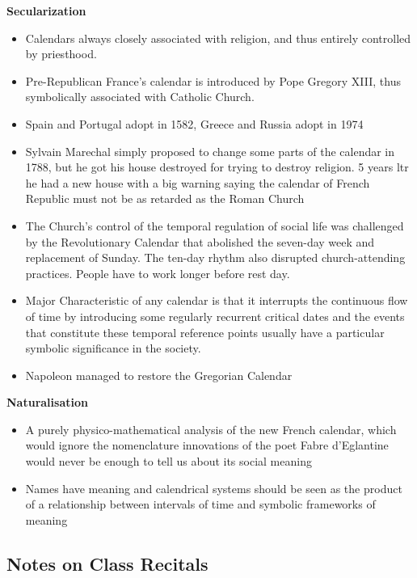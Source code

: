 \documentclass[a4paper]{article}
\begin{document}
\noindent\textbf{Secularization}
\begin{itemize}
	\item Calendars always closely associated with religion, and thus entirely controlled by priesthood.
	\item Pre-Republican France's calendar is introduced by Pope Gregory XIII, thus symbolically associated with Catholic Church.
	\item Spain and Portugal adopt in 1582, Greece and Russia adopt in 1974
	\item Sylvain Marechal simply proposed to change some parts of the calendar in 1788, but he got his house destroyed for trying to destroy religion. 5 years ltr he had a new house with a big warning saying the calendar of French Republic must not be as retarded as the Roman Church
	\item The Church's control of the temporal regulation of social life was challenged by the Revolutionary Calendar that abolished the seven-day week and replacement of Sunday. The ten-day rhythm also disrupted church-attending practices. People have to work longer before rest day.
	\item Major Characteristic of any calendar is that it interrupts the continuous flow of time by introducing some regularly recurrent critical dates and the events that constitute these temporal reference points usually have a particular symbolic significance in the society.
	\item Napoleon managed to restore the Gregorian Calendar 
\end{itemize}

\medskip

\noindent\textbf{Naturalisation}
\begin{itemize}
	\item A purely physico-mathematical analysis of the new French calendar, which would ignore the nomenclature innovations of the poet Fabre d'Eglantine would never be enough to tell us about its social meaning
	\item Names have meaning and calendrical systems should be seen as the product of a relationship between intervals of time and symbolic frameworks of meaning
\end{itemize}

\subsection{Notes on Class Recitals}
\end{document}
